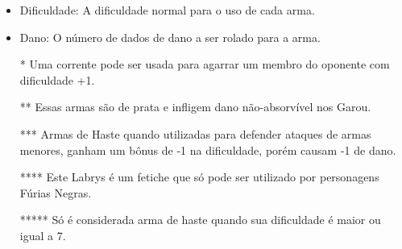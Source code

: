 \begin{itemize}[noitemsep]
\item Dificuldade: A dificuldade normal para o uso de cada arma.
\item Dano: O número de dados de dano a ser rolado para a arma.
\item[*] Uma corrente pode ser usada para agarrar um membro do oponente com dificuldade +1.
\item[**] Essas armas são de prata e infligem dano não-absorvível nos Garou.
\item[***] Armas de Haste quando utilizadas para defender ataques de armas menores, ganham um bônus de -1 na dificuldade, porém causam -1 de dano.
\item[****] Este Labrys é um fetiche que só pode ser utilizado por personagens Fúrias Negras.
\item[*****] Só é considerada arma de haste quando sua dificuldade é maior ou igual a 7.
\end{itemize}